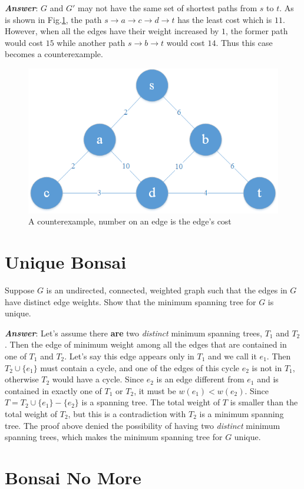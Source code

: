 \documentclass[11pt]{article}
\begin{document}
\noindent \textbf{\emph{Answer}}: $G$ and $G'$ may not have the same set of shortest paths from $s$  to $t$. As is shown in Fig.\ref{fig:3}, the path $s\rightarrow a\rightarrow c\rightarrow d\rightarrow t$ has the least cost which is $11$. However, when all the edges have their weight increased by $1$, the former path would cost $15$ while another path $s\rightarrow b\rightarrow t$ would cost $14$. Thus this case becomes a counterexample.
\begin{figure}[H]
	\centering
	\includegraphics[width=0.60\linewidth]{Figure/3.png}
	\caption{A counterexample, number on an edge is the edge's cost}
	\label{fig:3}
\end{figure}
\section{Unique Bonsai}
Suppose $G$ is an undirected, connected, weighted graph such that the edges in $G$ have distinct edge weights. Show that the minimum spanning tree for $G$ is unique.

\noindent \textbf{\emph{Answer}}: Let's assume there \textbf{are} two \emph{distinct} minimum spanning trees, $T_1$ and $T_2$.  Then the edge of minimum weight among all the edges that are contained in one of $T_1$ and $T_2$. Let's say this edge appears only in $T_1$ and we call it $e_1$. Then $T_2\cup \{e_1\}$ must contain a cycle, and one of the edges of this cycle $e_2$ is not in $T_1$, otherwise $T_2$ would have a cycle. Since $e_2$ is an edge different from $e_1$ and is contained in exactly one of $T_1$ or $T_2$, it must be $w(e_1)<w(e_2)$. Since $T=T_2\cup \{e_1\} - \{e_2\}$ is a spanning tree. The total weight of $T$ is smaller than the total weight of $T_2$, but this is a contradiction with $T_2$ is a minimum spanning tree. The proof above denied the possibility of having two \emph{distinct} minimum spanning trees, which makes the minimum spanning tree for $G$ unique.

\section{Bonsai No More}
\end{document}
